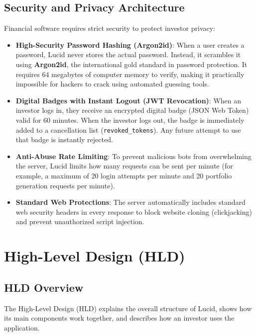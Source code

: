 \subsection{Security and Privacy Architecture}
Financial software requires strict security to protect investor privacy:
\begin{itemize}
    \item \textbf{High-Security Password Hashing (Argon2id)}: When a user creates a password, Lucid never stores the actual password. Instead, it scrambles it using \textbf{Argon2id}, the international gold standard in password protection. It requires 64 megabytes of computer memory to verify, making it practically impossible for hackers to crack using automated guessing tools.
    \item \textbf{Digital Badges with Instant Logout (JWT Revocation)}: When an investor logs in, they receive an encrypted digital badge (JSON Web Token) valid for 60 minutes. When the investor logs out, the badge is immediately added to a cancellation list (\texttt{revoked\_tokens}). Any future attempt to use that badge is instantly rejected.
    \item \textbf{Anti-Abuse Rate Limiting}: To prevent malicious bots from overwhelming the server, Lucid limits how many requests can be sent per minute (for example, a maximum of 20 login attempts per minute and 20 portfolio generation requests per minute).
    \item \textbf{Standard Web Protections}: The server automatically includes standard web security headers in every response to block website cloning (clickjacking) and prevent unauthorized script injection.
\end{itemize}

\section{High-Level Design (HLD)}
\label{sec:hld}

\subsection{HLD Overview}
The High-Level Design (HLD) explains the overall structure of Lucid, shows how its main components work together, and describes how an investor uses the application.

